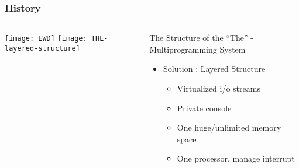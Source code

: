 \begin{frame}[plain]
	\frametitle{History}
	
	
	
	\begin{columns}
		
		\begin{column}{.4\textwidth}
			\centering
			\texttt{[image: EWD]}
			\texttt{[image: THE-layered-structure]}
			
			
			
		\end{column}
		
		\begin{column}{.6\textwidth}
			
			The Structure of the “The” - Multiprogramming System
			\begin{itemize}
				\item Solution : Layered Structure
				
				\begin{itemize}
					\item Virtualized i/o streams
					\item Private console
					\item One huge/unlimited memory space
					\item One processor, manage interrupt
				\end{itemize}
				
			\end{itemize}	
			
		\end{column}
		
		
	\end{columns}
	
	
\end{frame}


